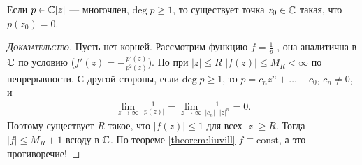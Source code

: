 \begin{thm}
 Если $ p \in \mathbb{C}[z] $ --- многочлен, $ \mathrm{deg}\;p \geqslant 1 $, то существует точка $ z_0 \in \mathbb{C} $ такая, что $ p(z_0) = 0 $.
\end{thm}
\begin{proof}[\normalfont\textsc{Доказательство}]
 Пусть нет корней. Рассмотрим функцию $ f = \frac{1}{p} $ , она аналитична в $ \mathbb{C} $  по условию ($ f'(z) = -\frac{p'(z)}{p^{2}(z)} $). Но при $ \left| z \right| \leqslant R $ $ \left| f(z) \right| \leqslant M_R < \infty $ по непрерывности. С другой стороны, если $ \mathrm{deg}\;p \geqslant 1 $, то $ p = c_n z^{n} + \ldots + c_0 $, $ c_n \neq 0 $, и 
 \begin{align*}
  \lim_{z \to \infty} \frac{1}{\left| p(z) \right|} = \lim_{z \to \infty} \frac{1}{\left| c_n \right| \cdot \left| z \right|^{n}} = 0.
 \end{align*} Поэтому существует $ R $ такое, что $ \left| f(z) \right| \leqslant 1 $ для всех $ \left| z \right| \geqslant R $. Тогда $ \left| f \right| \leqslant M_R + 1 $ всюду в $ \mathbb{C} $. По теореме \ref{theorem:liuvill} $ f \equiv \mathrm{const} $, а это противоречие!
\end{proof}

